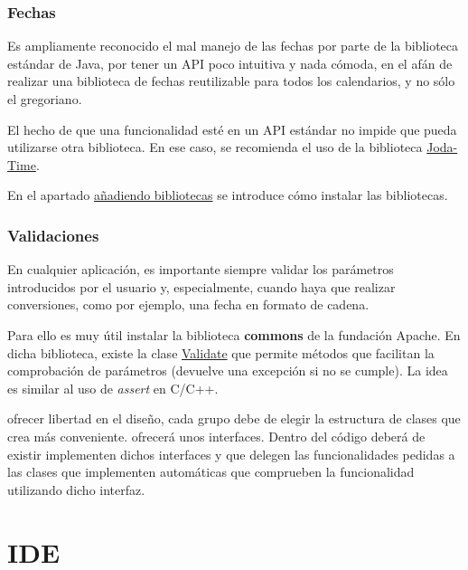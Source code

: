\documentclass[11pt]{article}
\begin{document}
\subsubsection{Fechas} \label{sec-2-2-2} Es ampliamente reconocido el mal manejo
de las fechas por parte de la biblioteca estándar de Java, por tener un API poco
intuitiva y nada cómoda, en el afán de realizar una biblioteca de fechas
reutilizable para todos los calendarios, y no sólo el gregoriano.

El hecho de que una funcionalidad esté en un API estándar no impide que pueda
utilizarse otra biblioteca. En ese caso, se recomienda el uso de la biblioteca
\href{http://joda-time.sourceforge.net/}{Joda-Time}.

En el apartado \hyperref[sec-5]{añadiendo bibliotecas} se introduce cómo
instalar las bibliotecas.

\subsubsection{Validaciones} \label{sec-2-2-3} En cualquier aplicación, es
importante siempre validar los parámetros introducidos por el usuario y,
especialmente, cuando haya que realizar conversiones, como por ejemplo, una
fecha en formato de cadena.

Para ello es muy útil instalar la biblioteca \textbf{commons} de la fundación
Apache. En dicha biblioteca, existe la clase
\href{http://commons.apache.org/lang/api-2.5/org/apache/commons/lang/Validate.html}{Validate}
que permite métodos que facilitan la comprobación de parámetros (devuelve una
excepción si no se cumple). La idea es similar al uso de \emph{assert} en C/C++.


ofrecer libertad en el diseño, cada grupo debe de elegir la estructura de clases
que crea más conveniente. %
ofrecerá unos interfaces. Dentro del código deberá de existir %
implementen dichos interfaces y que delegen las funcionalidades pedidas a las
clases que implementen %
automáticas que comprueben la funcionalidad utilizando dicho interfaz.


\section{IDE} \label{sec-3} \label{ide}
\end{document}
